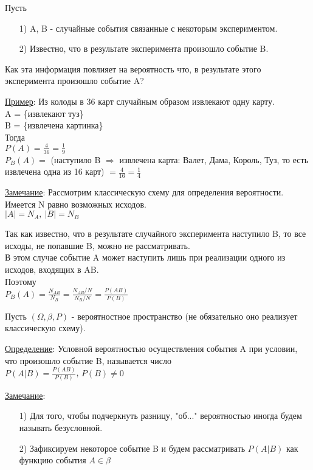 
Пусть
\begin{enumerate}
	\item[1)]
	A, B - случайные события связанные с некоторым экспериментом.
	
	\item[2)]
	Известно, что в результате эксперимента произошло событие B.
\end{enumerate}

Как эта информация повлияет на вероятность что, в результате этого эксперимента произошло событие A?

\underline{Пример}: Из колоды в 36 карт случайным образом извлекают одну карту. \\
A = \{извлекают туз\} \\
B = \{извлечена картинка\} \\
Тогда \\
$P(A) = \frac{4}{36} = \frac{1}{9}$ \\
$P_B(A) =$ (наступило B $\Rightarrow$ извлечена карта: Валет, Дама, Король, Туз, то есть извлечена одна из 16 карт) $ = \frac{4}{16} = \frac{1}{4}$

\underline{Замечание}: Рассмотрим классическую схему для определения вероятности. Имеется N равно возможных исходов. \\
$|A| = N_A, \ |B| = N_B$

Так как известно, что в результате случайного эксперимента наступило B, то все исходы, не попавшие B, можно не рассматривать. \\
В этом случае событие A может наступить лишь при реализации одного из исходов, входящих в AB. \\
Поэтому \\
$P_B(A) = \frac{N_{AB}}{N_B} = \frac{N_{AB} / N}{N_B / N} = \frac{P(AB)}{P(B)}$

Пусть $(\Omega, \beta, P)$ - вероятностное пространство (не обязательно оно реализует классическую схему).

\underline{Определение}: Условной вероятностью осуществления события A при условии, что произошло событие B, называется число \\
$P(A|B) = \frac{P(AB)}{P(B)}$, $P(B) \neq 0$

\underline{Замечание}:
\begin{enumerate}
	\item[1)]
	Для того, чтобы подчеркнуть разницу, "об..." вероятностью иногда будем называть безусловной.
	
	\item[2)]
	Зафиксируем некоторое событие B и будем рассматривать $P(A|B)$ как функцию события $A \in \beta$
\end{enumerate}

